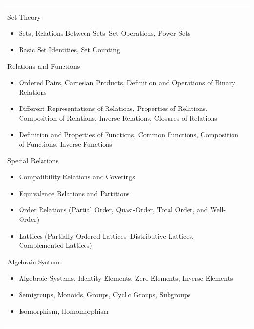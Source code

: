 \documentclass{article}
\begin{document}
\begin{longtable}{|p{3cm}|p{10cm}|}
Set Theory
\begin{itemize}
    \item Sets, Relations Between Sets, Set Operations, Power Sets
    \item Basic Set Identities, Set Counting
\end{itemize}

Relations and Functions
\begin{itemize}
    \item Ordered Pairs, Cartesian Products, Definition and Operations of Binary Relations
    \item Different Representations of Relations, Properties of Relations, Composition of Relations, Inverse Relations, Closures of Relations
    \item Definition and Properties of Functions, Common Functions, Composition of Functions, Inverse Functions
\end{itemize}

Special Relations
\begin{itemize}
    \item Compatibility Relations and Coverings
    \item Equivalence Relations and Partitions
    \item Order Relations (Partial Order, Quasi-Order, Total Order, and Well-Order)
    \item Lattices (Partially Ordered Lattices, Distributive Lattices, Complemented Lattices)
\end{itemize}

Algebraic Systems
\begin{itemize}
    \item Algebraic Systems, Identity Elements, Zero Elements, Inverse Elements
    \item Semigroups, Monoids, Groups, Cyclic Groups, Subgroups
    \item Isomorphism, Homomorphism
\end{itemize}\\


\end{longtable}
\end{document}
